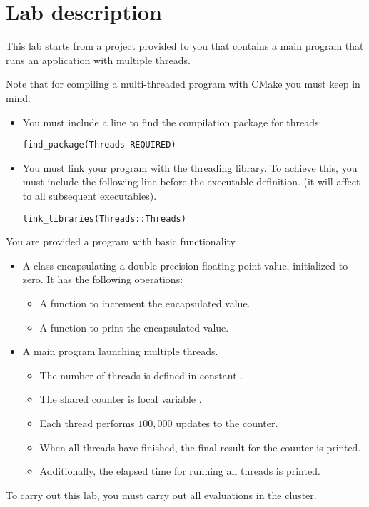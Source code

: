 \section{Lab description}

This lab starts from a project provided to you that contains a main program
that runs an application with multiple threads.

Note that for compiling a multi-threaded program with CMake you must keep in mind:

\begin{itemize}

\item You must include a line to find the compilation package for threads:
\begin{lstlisting}
find_package(Threads REQUIRED)
\end{lstlisting}

\item You must link your program with the threading library.
      To achieve this, you must include the following line before the executable definition.
      (it will affect to all subsequent executables).
\begin{lstlisting}
link_libraries(Threads::Threads)
\end{lstlisting}

\end{itemize}

You are provided a program  with basic functionality.

\begin{itemize}

\item A class  encapsulating a double precision floating point value, 
      initialized to zero.
      It has the following operations:
\begin{itemize}
  \item A  function to increment the encapsulated value.
  \item A  function to print the encapsulated value.
\end{itemize}

\item A main program launching multiple threads.
\begin{itemize}
  \item The number of threads is defined in constant .
  \item The shared counter is local variable .
  \item Each thread performs $100,000$ updates to the counter.
  \item When all threads have finished, the final result for the counter is printed.
  \item Additionally, the elapsed time for running all threads is printed.
\end{itemize}

\end{itemize}

To carry out this lab, you must carry out all evaluations in the
 cluster.
